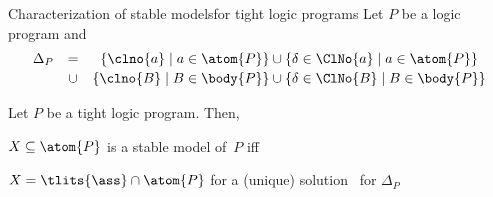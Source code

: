 \begin{frame}{Characterization of stable models}{for \alert<3>{tight} logic programs}
\bigskip
Let $P$ be a logic program and
\[
\begin{array}{lcr@{}c@{}l}
\Delta_P
& = &
\{\clno{a} \mid a\in\atom{P}\}
& {} \cup {} &
\{\delta\in\ClNo{a} \mid a\in\atom{P}\}
\\[2pt]
& \cup &
\{\clno{B} \mid B\in\body{P}\}
& {} \cup {} &
\{\delta\in\ClNo{B}\mid B\in\body{P}\}
\end{array}
\]
\bigskip
\pause
\begin{theorem}
Let $P$ be a \alert{tight} logic program. Then,

\qquad $X\subseteq\atom{P}$ is a stable model of~$P$ \alert{iff}

\qquad $X=\tlits{\ass}\cap\atom{P}$ for a (unique) solution \ass\ for $\Delta_P$
\end{theorem}
\end{frame}

